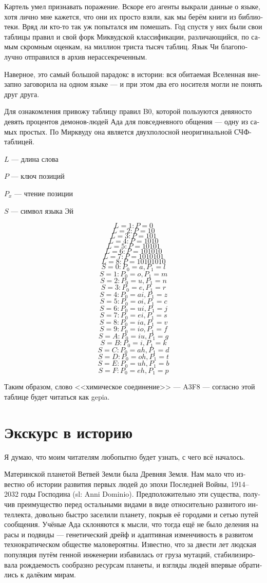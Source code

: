 \documentclass[a4paper,12pt,fleqn]{book}\usepackage{polyglossia}\setdefaultlanguage[babelshorthands=true]{russian}\setotherlanguage{english}\defaultfontfeatures{Ligatures=TeX,Mapping=tex-text}\usepackage{xcolor}\newcommand{\ml}[3]{#2}
\begin{document}
{Картель умел признавать поражение.
Вскоре его агенты выкрали данные о языке, хотя лично мне кажется, что они их просто взяли, как мы берём книги из библиотеки.
Вряд ли кто-то так уж попытался им помешать.
Год спустя у них были свои таблицы правил и свой форк Миквудской классификации, различающийся, по самым скромным оценкам, на миллион триста тысяч таблиц.
Язык Чи благополучно отправился в архив нерассекреченным.

Наверное, это самый большой парадокс в истории: вся обитаемая Вселенная внезапно заговорила на одном языке --- и при этом два его носителя могли не понять друг друга.

Для ознакомления привожу таблицу правил B0, которой пользуются девяносто девять процентов демонов-людей Ада для повседневного общения --- одну из самых простых.
По Мирквуду она является двухполосной неоригинальной СЧФ-таблицей.

$L$ --- длина слова

$P$ --- ключ позиций

$P_x$ --- чтение позиции

$S$ --- символ языка Эй

\[L = 1: P = 0\]
\[L = 2: P = 10\]
\[L = 3: P = 101\]
\[L = 4: P = 1010\]
\[L = 5: P = 10101\]
\[L = 6: P = 101010\]
\[L = 7: P = 1010101\]
\[L = 8: P = 10101010\]
\[S = 0: P_0 = a, P_1 = l\]
\[S = 1: P_0 = o, P_1 = m\]
\[S = 2: P_0 = u, P_1 = n\]
\[S = 3: P_0 = e, P_1 = r\]
\[S = 4: P_0 = ai, P_1 = z\]
\[S = 5: P_0 = oi, P_1 = c\]
\[S = 6: P_0 = ui, P_1 = j\]
\[S = 7: P_0 = ei, P_1 = s\]
\[S = 8: P_0 = ia, P_1 = v\]
\[S = 9: P_0 = io, P_1 = f\]
\[S = A: P_0 = iu, P_1 = g\]
\[S = B: P_0 = i, P_1 = k\]
\[S = C: P_0 = ah, P_1 = d\]
\[S = D: P_0 = oh, P_1 = t\]
\[S = E: P_0 = uh, P_1 = b\]
\[S = F: P_0 = eh, P_1 = p\]

Таким образом, слово <<химическое соединение>> --- A3F8 --- согласно этой таблице будет читаться как gepia.

\section{Экскурс в историю}

Я думаю, что моим читателям любопытно будет узнать, с чего всё началось.

Материнской планетой Ветвей Земли была Древняя Земля.
Нам мало что известно об истории развития первых людей до эпохи Последней Войны, 1914--2032 годы Господина (sl: Anni Dominio).
Предположительно эти существа, получив преимущество перед остальными видами в виде относительно развитого интеллекта, довольно быстро заселили планету, покрыв её городами и сетью путей сообщения.
Учёные Ада склоняются к мысли, что тогда ещё не было деления на расы и подвиды --- генетический дрейф и адаптивная изменчивость в развитом технократическом обществе маловероятны.
Известно, что за двести лет людская популяция путём генной инженерии избавилась от груза мутаций, стабилизировала рождаемость сообразно ресурсам планеты, и взгляды людей впервые обратились к далёким мирам.

}
\end{document}
